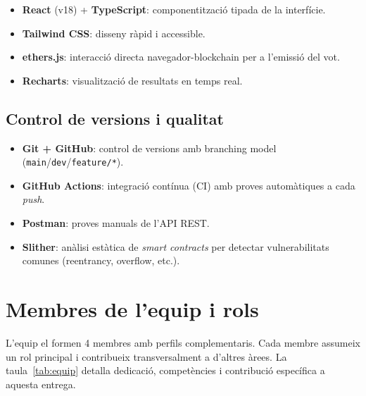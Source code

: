 \documentclass[12pt,a4paper,catalan]{article}
\begin{document}
\begin{itemize}
    \item \textbf{React} (v18) + \textbf{TypeScript}: componentització tipada de la interfície.
    \item \textbf{Tailwind CSS}: disseny ràpid i accessible.
    \item \textbf{ethers.js}: interacció directa navegador-blockchain per a l'emissió del vot.
    \item \textbf{Recharts}: visualització de resultats en temps real.
\end{itemize}

\subsection{Control de versions i qualitat}

\begin{itemize}
    \item \textbf{Git + GitHub}: control de versions amb branching model (\texttt{main}/\texttt{dev}/\texttt{feature/*}).
    \item \textbf{GitHub Actions}: integració contínua (CI) amb proves automàtiques a cada \textit{push}.
    \item \textbf{Postman}: proves manuals de l'API REST.
    \item \textbf{Slither}: anàlisi estàtica de \textit{smart contracts} per detectar vulnerabilitats comunes (reentrancy, overflow, etc.).
\end{itemize}

\section{Membres de l'equip i rols}

L'equip el formen 4 membres amb perfils complementaris. Cada membre assumeix un rol principal i contribueix transversalment a d'altres àrees. La taula~\ref{tab:equip} detalla dedicació, competències i contribució específica a aquesta entrega.
\end{document}
